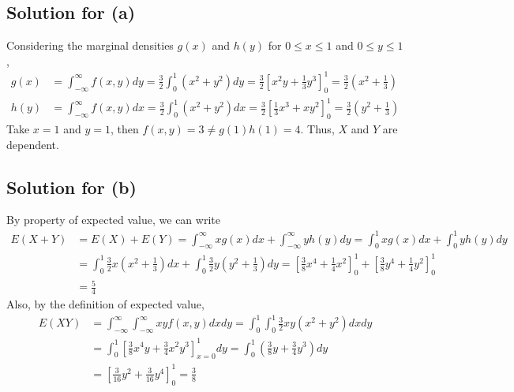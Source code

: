 \documentclass{scrartcl}
\begin{document}
\subsection{Solution for (a)}
Considering the marginal densities \(g(x)\) and \(h(y)\) for \(0 \leq x \leq
1\) and \(0 \leq y \leq 1\),
\begin{align*}
  g(x)
  &= \int^\infty_{-\infty} f(x, y) dy
  = \frac{3}{2} \int^1_0 (x^2 + y^2) dy
  = \frac{3}{2} \left[ x^2 y + \frac{1}{3} y^3 \right]^1_0
  = \frac{3}{2} \left( x^2 + \frac{1}{3} \right) \\
  h(y)
  &= \int^\infty_{-\infty} f(x, y) dx
  = \frac{3}{2} \int^1_0 (x^2 + y^2) dx
  = \frac{3}{2} \left[ \frac{1}{3}x^3 + xy^2 \right]^1_0
  = \frac{3}{2} \left( y^2 + \frac{1}{3} \right)
\end{align*}
Take \(x = 1\) and \(y = 1\), then \(f(x, y) = 3 \not = g(1) h(1) = 4\). Thus,
\(X\) and \(Y\) are dependent.

\subsection{Solution for (b)}
By property of expected value, we can write
\begin{align*}
  E(X + Y)
  &= E(X) + E(Y)
  = \int^\infty_{-\infty} x g(x) dx + \int^\infty_{-\infty} y h(y) dy
  = \int^1_0 x g(x) dx + \int^1_0 y h(y) dy \\
  &= \int^1_0 \frac{3}{2} x \left( x^2 + \frac{1}{3} \right) dx
  + \int^1_0 \frac{3}{2} y \left( y^2 + \frac{1}{3} \right) dy
  = \left[ \frac{3}{8} x^4 + \frac{1}{4} x^2 \right]^1_0
  + \left[ \frac{3}{8} y^4 + \frac{1}{4} y^2 \right]^1_0 \\
  &= \frac{5}{4}
\end{align*}
Also, by the definition of expected value,
\begin{align*}
  E(XY)
  &= \int^\infty_{-\infty} \int^\infty_{-\infty} xy f(x, y) dx dy
  = \int^1_0 \int^1_0 \frac{3}{2} xy(x^2 + y^2) dx dy \\
  &= \int^1_0 \left[ \frac{3}{8} x^4 y + \frac{3}{4} x^2 y^3 \right]^1_{x = 0} dy
  = \int^1_0 \left( \frac{3}{8} y + \frac{3}{4} y^3 \right) dy \\
  &= \left[ \frac{3}{16} y^2 + \frac{3}{16} y^4 \right]^1_0
  = \frac{3}{8}
\end{align*}
\end{document}
